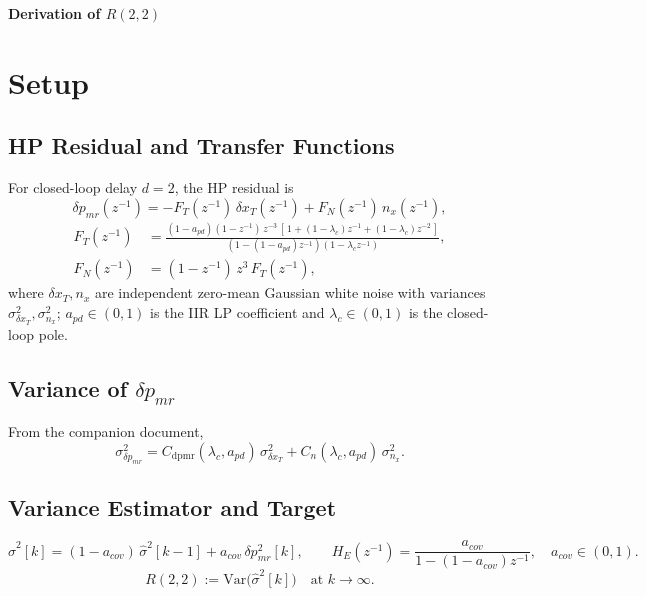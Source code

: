 \documentclass[11pt,a4paper]{ctexart}
\newcommand{\lc}{\lambda_c}
\newcommand{\dxT}{\delta x_{T}}
\newcommand{\nx}{n_{x}}
\newcommand{\dpmr}{\delta p_{mr}}
\newcommand{\FT}{F_{T}}
\newcommand{\FN}{F_{N}}
\newcommand{\HE}{H_{E}}
\newcommand{\Cdpmr}{C_{\mathrm{dpmr}}}
\newcommand{\Cn}{C_{n}}
\newcommand{\apd}{a_{pd}}
\newcommand{\acov}{a_{cov}}
\newcommand{\sighatsq}{\hat{\sigma}^{2}}
\begin{document}
\thispagestyle{empty}

\begin{center}
{\Large\bfseries Derivation of $R(2,2)$}
\end{center}
\vspace{0.3cm}

\section{Setup}

\subsection{HP Residual and Transfer Functions}

For closed-loop delay $d=2$, the HP residual is
\begin{equation}
\dpmr(z^{-1}) = -\FT(z^{-1})\,\dxT(z^{-1}) + \FN(z^{-1})\,\nx(z^{-1}),
\label{eq:dpmr}
\end{equation}
\begin{align}
\FT(z^{-1}) &= \frac{(1-\apd)(1-z^{-1})\,z^{-3}\,[\,1+(1-\lc)z^{-1}+(1-\lc)z^{-2}\,]}{(1-(1-\apd)z^{-1})(1-\lc z^{-1})}, \label{eq:FT}\\[2pt]
\FN(z^{-1}) &= (1-z^{-1})\,z^{3}\,\FT(z^{-1}), \label{eq:FN-vs-FT}
\end{align}
where $\dxT,\nx$ are independent zero-mean Gaussian white noise with variances $\sigma^{2}_{\dxT},\sigma^{2}_{\nx}$; $\apd\in(0,1)$ is the IIR LP coefficient and $\lc\in(0,1)$ is the closed-loop pole.

\subsection{Variance of $\dpmr$}

From the companion document,
\begin{equation}
\sigma^{2}_{\dpmr} = \Cdpmr(\lc,\apd)\,\sigma^{2}_{\dxT} + \Cn(\lc,\apd)\,\sigma^{2}_{\nx}.
\label{eq:sigma-dpmr}
\end{equation}

\subsection{Variance Estimator and Target}

\begin{equation}
\sighatsq[k] = (1-\acov)\,\sighatsq[k-1] + \acov\,\dpmr^{2}[k],
\qquad
\HE(z^{-1}) = \frac{\acov}{1-(1-\acov)z^{-1}},\quad \acov\in(0,1).
\label{eq:EWMA}
\end{equation}
\begin{equation}
R(2,2) := \mathrm{Var}\bigl(\sighatsq[k]\bigr)\quad\text{at }k\to\infty.
\label{eq:R22-def}
\end{equation}
\end{document}
